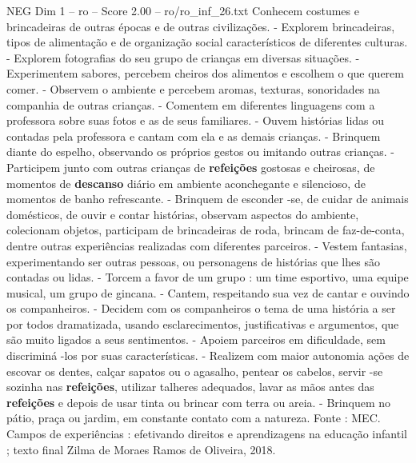 \begin{textsample}{NEG Dim 1 – ro – Score 2.00 – ro/ro\_inf\_26.txt}
Conhecem costumes e brincadeiras de outras épocas e de outras civilizações. - Explorem brincadeiras, tipos de alimentação e de organização social característicos de diferentes culturas. - Explorem fotografias do seu grupo de crianças em diversas situações. - Experimentem sabores, percebem cheiros dos alimentos e escolhem o que querem comer. - Observem o ambiente e percebem aromas, texturas, sonoridades na companhia de outras crianças. - Comentem em diferentes linguagens com a professora sobre suas fotos e as de seus familiares. - Ouvem histórias lidas ou contadas pela professora e cantam com ela e as demais crianças. - Brinquem diante do espelho, observando os próprios gestos ou imitando outras crianças. - Participem junto com outras crianças de \textbf{refeições} gostosas e cheirosas, de momentos de \textbf{descanso} diário em ambiente aconchegante e silencioso, de momentos de banho refrescante. - Brinquem de esconder -se, de cuidar de animais domésticos, de ouvir e contar histórias, observam aspectos do ambiente, colecionam objetos, participam de brincadeiras de roda, brincam de faz-de-conta, dentre outras experiências realizadas com diferentes parceiros. - Vestem fantasias, experimentando ser outras pessoas, ou personagens de histórias que lhes são contadas ou lidas. - Torcem a favor de um grupo : um time esportivo, uma equipe musical, um grupo de gincana. - Cantem, respeitando sua vez de cantar e ouvindo os companheiros. - Decidem com os companheiros o tema de uma história a ser por todos dramatizada, usando esclarecimentos, justificativas e argumentos, que são muito ligados a seus sentimentos. - Apoiem parceiros em dificuldade, sem discriminá -los por suas características. - Realizem com maior autonomia ações de escovar os dentes, calçar sapatos ou o agasalho, pentear os cabelos, servir -se sozinha nas \textbf{refeições}, utilizar talheres adequados, lavar as mãos antes das \textbf{refeições} e depois de usar tinta ou brincar com terra ou areia. - Brinquem no pátio, praça ou jardim, em constante contato com a natureza.
Fonte : MEC.
Campos de experiências : efetivando direitos e aprendizagens na educação infantil ; texto final Zilma de Moraes Ramos de Oliveira, 2018.

\end{textsample}
